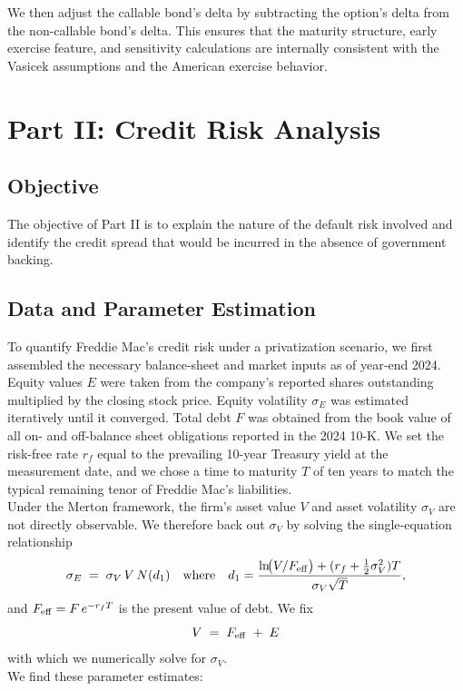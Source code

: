 \documentclass{article}
\begin{document}
We then adjust the callable bond’s delta by subtracting the option's delta from the non-callable bond's delta. This ensures that the maturity structure, early exercise feature, and sensitivity calculations are internally consistent with the Vasicek assumptions and the American exercise behavior.


\section{Part II: Credit Risk Analysis}
\subsection{Objective}
The objective of Part II is to explain the nature of the default risk involved and identify the credit spread that would be incurred in the absence of government backing. 

\subsection{Data and Parameter Estimation}

To quantify Freddie Mac’s credit risk under a privatization scenario, we first assembled the necessary balance‐sheet and market inputs as of year‐end 2024.  Equity values \(E\) were taken from the company’s reported shares outstanding multiplied by the closing stock price.  Equity volatility \(\sigma_{E}\) was estimated iteratively until it converged.  Total debt \(F\) was obtained from the book value of all on- and off-balance sheet obligations reported in the 2024 10-K.  We set the risk-free rate \(r_{f}\) equal to the prevailing 10-year Treasury yield at the measurement date, and we chose a time to maturity \(T\) of ten years to match the typical remaining tenor of Freddie Mac’s liabilities. \\

Under the Merton framework, the firm’s asset value \(V\) and asset volatility \(\sigma_{V}\) are not directly observable.  We therefore back out \(\sigma_{V}\) by solving the single‐equation relationship
\[
  \sigma_{E}
  \;=\;\sigma_{V}\,V\,N(d_{1})
  \quad\text{where}\quad
  d_{1}
  =\frac{\ln\!\bigl(V/F_{\rm eff}\bigr)+(r_{f}+\tfrac12\sigma_{V}^{2})T}{\sigma_{V}\sqrt{T}},
\]
and \(F_{\rm eff}=F\,e^{-r_{f}T}\) is the present value of debt.  We fix
\[
  V \;=\;F_{\rm eff}\;+\;E
\]
with which we numerically solve for \(\sigma_{V}\). \\

We find these parameter estimates:
\end{document}
